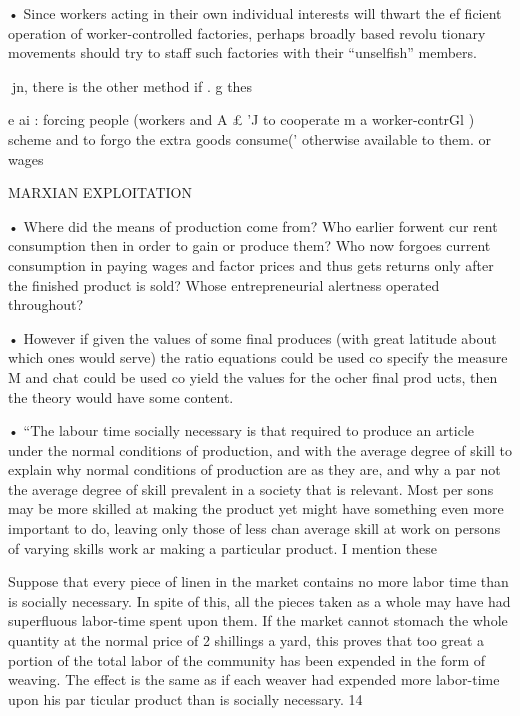 \documentclass[11pt,openany]{book}
\begin{document}
{• Since workers acting in their own individual interests will thwart the ef ficient operation of worker-controlled factories, perhaps broadly based revolu tionary movements should try to staff such factories with their ``unselfish'' members.\par

jn, there is the other method if . g thes\par

e ai : forcing people (workers and A £ 'J to cooperate m a worker-contrGl ) scheme and to forgo the extra goods consume(' otherwise available to them. or wages\par

MARXIAN EXPLOITATION\par

• Where did the means of production come from? Who earlier forwent cur rent consumption then in order to gain or produce them? Who now forgoes current consumption in paying wages and factor prices and thus gets returns only after the finished product is sold? Whose entrepreneurial alertness operated throughout?\par

• However if given the values of some final produces (with great latitude about which ones would serve) the ratio equations could be used co specify the measure M and chat could be used co yield the values for the ocher final prod ucts, then the theory would have some content.\par

• ``The labour time socially necessary is that required to produce an article under the normal conditions of production, and with the average degree of skill to explain why normal conditions of production are as they are, and why a par not the average degree of skill prevalent in a society that is relevant. Most per sons may be more skilled at making the product yet might have something even more important to do, leaving only those of less chan average skill at work on persons of varying skills work ar making a particular product. I mention these\par

Suppose that every piece of linen in the market contains no more labor time than is socially necessary. In spite of this, all the pieces taken as a whole may have had superfluous labor-time spent upon them. If the market cannot stomach the whole quantity at the normal price of 2 shillings a yard, this proves that too great a portion of the total labor of the community has been expended in the form of weaving. The effect is the same as if each weaver had expended more labor-time upon his par ticular product than is socially necessary. 14\par

}
\end{document}
